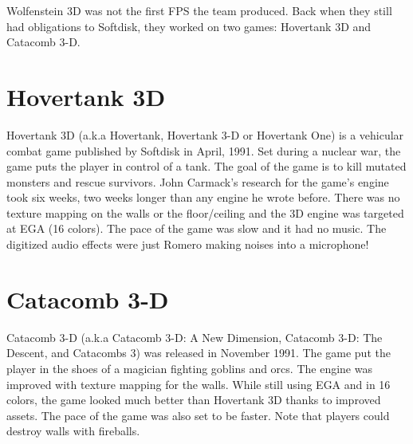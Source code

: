 Wolfenstein 3D was not the first FPS the team produced. Back when they still had obligations to Softdisk, they worked on two games: Hovertank 3D and Catacomb 3-D.\\
\par
\section{Hovertank 3D}
Hovertank 3D (a.k.a Hovertank, Hovertank 3-D or Hovertank One) is a vehicular combat game published by Softdisk in April, 1991. Set during a nuclear war, the game puts the player in control of a tank. The goal of the game is to kill mutated monsters and rescue survivors. John Carmack's research for the game's engine took six weeks, two weeks longer than any engine he wrote before. There was no texture mapping on the walls or the floor/ceiling and the 3D engine was targeted at EGA (16 colors). The pace of the game was slow and it had no music. The digitized audio effects were just Romero making noises into a microphone! \\
\par

\section{Catacomb 3-D}
Catacomb 3-D (a.k.a Catacomb 3-D: A New Dimension, Catacomb 3-D: The Descent, and Catacombs 3) was released in November 1991. The game put the player in the shoes of a magician fighting goblins and orcs. The engine was improved with texture mapping for the walls. While still using EGA and in 16 colors, the game looked much better than Hovertank 3D thanks to improved assets. The pace of the game was also set to be faster. Note that players could destroy walls with fireballs.\\
\par
\begin{minipage}{\textwidth}
\label{hovertank3d_screenshot}
\begin{figure}[H]
\centering
{}
\end{figure}

\begin{figure}[H]
\centering
{}
\end{figure}
\end{minipage}


\begin{minipage}{\textwidth}
\label{catacomb3d_screenshot}
\begin{figure}[H]
\centering
{}
\end{figure}

\begin{figure}[H]
\centering
{}
\end{figure}
\end{minipage}

